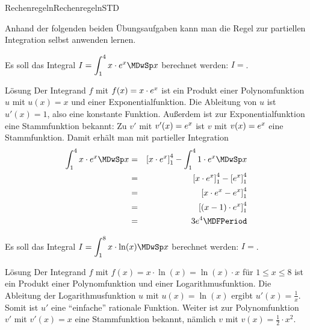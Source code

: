 \begin{MXContent}{Rechenregeln}{Rechenregeln}{STD}
\begin{MCOSHZusatz}
Anhand der folgenden beiden Übungsaufgaben kann man die Regel zur 
partiellen Integration selbst anwenden lernen.

\begin{MExercise}
Es soll das Integral $\displaystyle I = \int_{1}^{4} x \cdot \MEU^{x} \MDwSp x$
berechnet werden: $I = $. 

\begin{MHint}{Lösung}
Der Integrand $f$ mit $f(x) = x \cdot e^{x}$ ist ein Produkt einer 
Polynomfunktion $u$ mit $u(x) = x$ und einer Exponentialfunktion. Die 
Ableitung von $u$ ist $u'(x) = 1$, also eine konstante Funktion. Außerdem 
ist zur Exponentialfunktion eine Stammfunktion bekannt: Zu $v'$ mit 
$v'(x) = e^{x}$ ist $v$ mit $v(x) = e^{x}$ eine Stammfunktion. 
Damit erhält man mit partieller Integration
\begin{eqnarray*}
 \int_{1}^{4} x \cdot \MEU^{x} \MDwSp x %
& = & \left[ x \cdot \MEU^{x} \right]_{1}^{4} - \int_{1}^{4} 1 \cdot \MEU^{x} \MDwSp x \\
& = & \left[ x \cdot \MEU^{x} \right]_{1}^{4} - \left[ \MEU^{x} \right]_{1}^{4} \\
& = & \left[ x \cdot \MEU^{x} - \MEU^{x} \right]_{1}^{4} \\
& = & \left[ (x - 1) \cdot \MEU^{x} \right]_{1}^{4} \\
& = & 3 \MEU^{4} \MDFPeriod %
\end{eqnarray*}
\end{MHint}
\end{MExercise}

\begin{MExercise}
Es soll das Integral $I = \displaystyle \int_{1}^{8} x \cdot \ln(x) \MDwSp x$
berechnet werden: $I = $. 

\begin{MHint}{Lösung}
Der Integrand $f$ mit $f(x) = x \cdot \ln(x) = \ln(x) \cdot x$ für 
$1 \leq x \leq 8$ ist ein Produkt einer Polynomfunktion und einer 
Logarithmusfunktion. Die Ableitung der Logarithmusfunktion $u$ mit 
$u(x) = \ln(x)$ ergibt $u'(x) = \frac{1}{x}$.
Somit ist $u'$ eine "`einfache"' rationale Funktion. Weiter ist zur 
Polynomfunktion $v'$ mit $v'(x) = x$ eine Stammfunktion bekannt,
nämlich $v$ mit $v(x) = \frac{1}{2} \cdot x^2$. 


\end{MHint}
\end{MExercise}
\end{MCOSHZusatz}
\end{MXContent}
